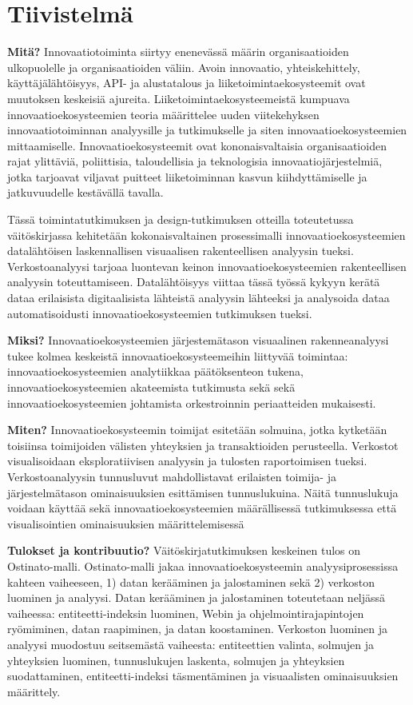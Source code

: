 \chapter{Tiivistelmä}

\textbf{Mitä?} Innovaatiotoiminta siirtyy enenevässä määrin organisaatioiden ulkopuolelle ja organisaatioiden väliin. Avoin innovaatio, yhteiskehittely, käyttäjälähtöisyys, API- ja alustatalous ja liiketoimintaekosysteemit ovat muutoksen keskeisiä ajureita. Liiketoimintaekosysteemeistä kumpuava innovaatioekosysteemien teoria määrittelee uuden viitekehyksen innovaatiotoiminnan analyysille ja tutkimukselle ja siten innovaatioekosysteemien mittaamiselle. Innovaatioekosysteemit ovat kononaisvaltaisia organisaatioiden rajat ylittäviä, poliittisia, taloudellisia ja teknologisia innovaatiojärjestelmiä, jotka tarjoavat viljavat puitteet liiketoiminnan kasvun kiihdyttämiselle ja jatkuvuudelle kestävällä tavalla.

Tässä toimintatutkimuksen ja design-tutkimuksen otteilla toteutetussa väitöskirjassa kehitetään kokonaisvaltainen prosessimalli innovaatioekosysteemien datalähtöisen laskennallisen visuaalisen rakenteellisen analyysin tueksi. Verkostoanalyysi tarjoaa luontevan keinon innovaatioekosysteemien rakenteellisen analyysin toteuttamiseen. Datalähtöisyys viittaa tässä työssä kykyyn kerätä dataa erilaisista digitaalisista lähteistä analyysin lähteeksi ja analysoida dataa automatisoidusti innovaatioekosysteemien tutkimuksen tueksi.

\textbf{Miksi?} Innovaatioekosysteemien järjestemätason visuaalinen rakenneanalyysi tukee kolmea keskeistä innovaatioekosysteemeihin liittyvää toimintaa: innovaatioekosysteemien analytiikkaa päätöksenteon tukena, innovaatioekosysteemien akateemista tutkimusta sekä sekä innovaatioekosysteemien johtamista orkestroinnin periaatteiden mukaisesti. 

\textbf{Miten?} Innovaatioekosysteemin toimijat esitetään solmuina, jotka kytketään toisiinsa toimijoiden välisten yhteyksien ja transaktioiden perusteella. Verkostot visualisoidaan eksploratiivisen analyysin ja tulosten raportoimisen tueksi. Verkostoanalyysin tunnusluvut mahdollistavat erilaisten toimija- ja järjestelmätason ominaisuuksien esittämisen tunnuslukuina. Näitä tunnuslukuja voidaan käyttää sekä innovaatioekosysteemien määrällisessä tutkimuksessa että visualisointien ominaisuuksien määrittelemisessä

\textbf{Tulokset ja kontribuutio?} Väitöskirjatutkimuksen keskeinen tulos on Ostinato-malli. Ostinato-malli jakaa innovaatioekosysteemin analyysiprosessissa kahteen vaiheeseen, 1) datan kerääminen ja jalostaminen sekä 2) verkoston luominen ja analyysi. Datan kerääminen ja jalostaminen toteutetaan neljässä vaiheessa: entiteetti-indeksin luominen, Webin ja ohjelmointirajapintojen ryömiminen, datan raapiminen, ja datan koostaminen. Verkoston luominen ja analyysi muodostuu seitsemästä vaiheesta: entiteettien valinta, solmujen ja yhteyksien luominen, tunnuslukujen laskenta, solmujen ja yhteyksien suodattaminen, entiteetti-indeksi täsmentäminen ja visuaalisten ominaisuuksien määrittely. 

